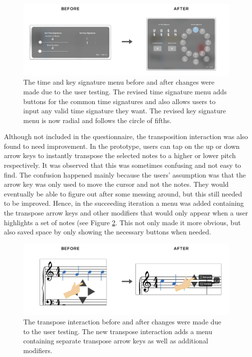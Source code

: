 			\begin{figure}[H]
				\centering
				\includegraphics[scale=0.28]{figures/before-after-tsmenu}
			    \caption{The time and key signature menu before and after changes were made due to the user testing. The revised time signature menu adds buttons for the common time signatures and also allows users to input any valid time signature they want. The revised key signature menu is now radial and follows the circle of fifths.}
			    \label{fig:time-key-signature}
			\end{figure} 

			Although not included in the questionnaire, the transposition interaction was also found to need improvement. In the prototype, users can tap on the up or down arrow keys to instantly transpose the selected notes to a higher or lower pitch respectively. It was observed that this was sometimes confusing and not easy to find. The confusion happened mainly because the users' assumption was that the arrow key was only used to move the cursor and not the notes. They would eventually be able to figure out after some messing around, but this still needed to be improved. Hence, in the succeeding iteration a menu was added containing the transpose arrow keys and other modifiers that would only appear when a user highlights a set of notes (see Figure \ref{fig:transpose}. This not only made it more obvious, but also saved space by only showing the necessary buttons when needed.

			\begin{figure}[h]
				\centering
				\includegraphics[scale=0.25]{figures/before-after-transpose}
			    \caption{The transpose interaction before and after changes were made due to the user testing. The new transpose interaction adds a menu containing separate transpose arrow keys as well as additional modifiers.}
			    \label{fig:transpose}
			\end{figure}

